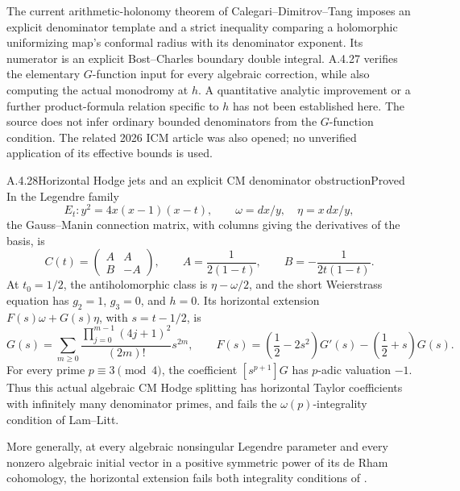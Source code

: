 The current arithmetic-holonomy theorem of Calegari--Dimitrov--Tang \cite[Theorem 2.5.1, pp.16--17]{EllCDT2024} imposes an explicit denominator template and a strict inequality comparing a holomorphic uniformizing map's conformal radius with its denominator exponent. Its numerator is an explicit Bost--Charles boundary double integral. A.4.27 verifies the elementary $G$-function input for every algebraic correction, while also computing the actual monodromy at $h$. A quantitative analytic improvement or a further product-formula relation specific to $h$ has not been established here. The source does not infer ordinary bounded denominators from the $G$-function condition. The related 2026 ICM article \cite{EllCDT2026} was also opened; no unverified application of its effective bounds is used.

\begin{result}{A.4.28}{Horizontal Hodge jets and an explicit CM denominator obstruction}{Proved}
In the Legendre family
\[
 E_t:y^2=4x(x-1)(x-t),\qquad
 \omega=dx/y,\quad \eta=x\,dx/y,
\]
the Gauss--Manin connection matrix, with columns giving the derivatives of the basis, is
\[
 C(t)=\begin{pmatrix}A&A\\ B&-A\end{pmatrix},\qquad
 A=\frac1{2(1-t)},\qquad B=-\frac1{2t(1-t)}.
\]
At $t_0=1/2$, the antiholomorphic class is $\eta-\omega/2$, and the short Weierstrass equation has $g_2=1$, $g_3=0$, and $h=0$. Its horizontal extension $F(s)\omega+G(s)\eta$, with $s=t-1/2$, is
\[
 G(s)=\sum_{m\ge0}
 \frac{\prod_{j=0}^{m-1}(4j+1)^2}{(2m)!}s^{2m},
 \qquad
 F(s)=\left(\frac12-2s^2\right)G'(s)
       -\left(\frac12+s\right)G(s).
\]
For every prime $p\equiv3\pmod4$, the coefficient $[s^{p+1}]G$ has $p$-adic valuation $-1$. Thus this actual algebraic CM Hodge splitting has horizontal Taylor coefficients with infinitely many denominator primes, and fails the $\omega(p)$-integrality condition of Lam--Litt.

More generally, at every algebraic nonsingular Legendre parameter and every nonzero algebraic initial vector in a positive symmetric power of its de Rham cohomology, the horizontal extension fails both integrality conditions of \cite[Theorem 4.1.1, p.21]{EllLamLitt2025}.
\end{result}
